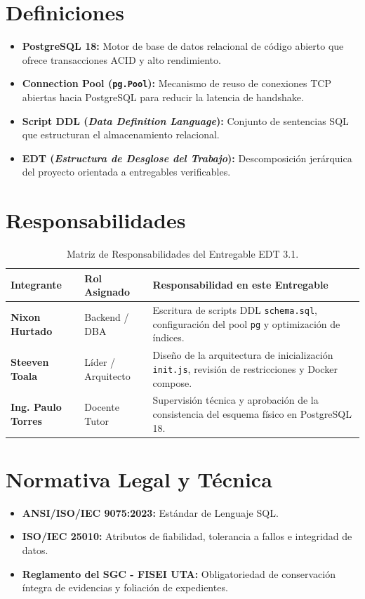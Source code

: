 \documentclass[11pt,a4paper]{article}
\begin{document}
\section{Definiciones}
\begin{itemize}[leftmargin=1.5em, itemsep=2pt]
    \item \textbf{PostgreSQL 18:} Motor de base de datos relacional de código abierto que ofrece transacciones ACID y alto rendimiento.
    \item \textbf{Connection Pool (\texttt{pg.Pool}):} Mecanismo de reuso de conexiones TCP abiertas hacia PostgreSQL para reducir la latencia de handshake.
    \item \textbf{Script DDL (\textit{Data Definition Language}):} Conjunto de sentencias SQL que estructuran el almacenamiento relacional.
    \item \textbf{EDT (\textit{Estructura de Desglose del Trabajo}):} Descomposición jerárquica del proyecto orientada a entregables verificables.
\end{itemize}

\section{Responsabilidades}
\begin{table}[htbp]
\centering
\small
\begin{tabularx}{\textwidth}{|>{\hsize=0.65\hsize\bfseries}X|>{\hsize=0.85\hsize}X|>{\hsize=1.5\hsize}X|}
    \hline
    \rowcolor{tableheader}
    Integrante & Rol Asignado & Responsabilidad en este Entregable \\
    \hline
    Nixon Hurtado & Backend / DBA & Escritura de scripts DDL \texttt{schema.sql}, configuración del pool \texttt{pg} y optimización de índices. \\
    \hline
    Steeven Toala & Líder / Arquitecto & Diseño de la arquitectura de inicialización \texttt{init.js}, revisión de restricciones y Docker compose. \\
    \hline
    Ing. Paulo Torres & Docente Tutor & Supervisión técnica y aprobación de la consistencia del esquema físico en PostgreSQL 18. \\
    \hline
\end{tabularx}
\caption{Matriz de Responsabilidades del Entregable EDT 3.1.}
\end{table}

\section{Normativa Legal y Técnica}
\begin{itemize}[leftmargin=1.5em, itemsep=2pt]
    \item \textbf{ANSI/ISO/IEC 9075:2023:} Estándar de Lenguaje SQL.
    \item \textbf{ISO/IEC 25010:} Atributos de fiabilidad, tolerancia a fallos e integridad de datos.
    \item \textbf{Reglamento del SGC - FISEI UTA:} Obligatoriedad de conservación íntegra de evidencias y foliación de expedientes.
\end{itemize}
\end{document}
